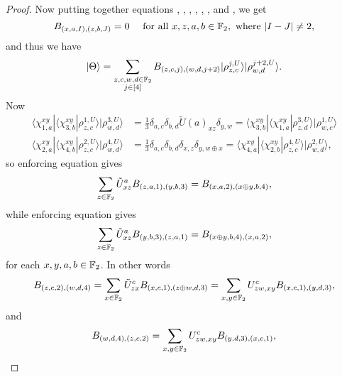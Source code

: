 \documentclass[../thesis-main/thesis-main]{subfiles}
\begin{document}
\begin{proof}
Now putting together equations , , , , , , and , we get
\begin{equation}
  B_{\left(x,a,I\right),\left(z,b,J\right)}=0\quad \text{ for all } x,z,a,b\in \mathbb{F}_2,\text{ where } |I- J| \neq 2,
\end{equation}
and thus we have
\begin{equation}
  |\Theta\rangle=\sum_{\substack{z,c,w,d\in \mathbb{F}_2\\j\in [4]} }B_{\left(z,c,j\right),\left(w,d,j+2\right)}|\rho_{z,c}^{j,U}\rangle|\rho_{w,d}^{j+2,U}\rangle.\label{eq:sum4terms}
\end{equation}
Now 
\begin{align}
  \langle\chi_{1,a}^{xy}|\langle\chi_{3,b}^{xy}|\rho_{z,c}^{1,U}\rangle|\rho_{w,d}^{3,U}\rangle & =\frac{1}{3}\delta_{a,c}\delta_{b,d} \tilde{U}(a)_{xz} \delta_{y,w} =  \langle\chi_{3,b}^{xy}|\langle\chi_{1,a}^{xy}|\rho_{z,d}^{3,U}\rangle|\rho_{w,c}^{1,U}\rangle\\
  \langle\chi_{2,a}^{xy}|\langle\chi_{4,b}^{xy}|\rho_{z,c}^{2,U}\rangle|\rho_{w,d}^{4,U}\rangle & =\frac{1}{3}\delta_{a,c}\delta_{b,d} \delta_{x,z} \delta_{y,w\oplus x} = \langle\chi_{4,a}^{xy}|\langle\chi_{2,b}^{xy}|\rho_{z,c}^{4,U}\rangle|\rho_{w,d}^{2,U}\rangle,
\end{align}
so enforcing equation  gives 
\begin{equation}
  \sum_{z\in\mathbb{F}_2}\tilde{U}^a_{xz}B_{\left(z,a,1\right),\left(y,b,3\right)}=B_{\left(x,a,2\right),\left(x\oplus y,b,4\right)},
\end{equation}
while enforcing equation  gives
\begin{equation}
  \sum_{z\in\mathbb{F}_2}\tilde{U}^a_{xz}B_{\left(y,b,3\right),\left(z,a,1\right)}=B_{\left(x\oplus y,b,4\right),\left(x,a,2\right)},
\end{equation}
for each $x,y,a,b\in\mathbb{F}_2$. In other words 
\begin{equation}
  B_{\left(z,c,2\right),\left(w,d,4\right)} =\sum_{x\in\mathbb{F}_2}\tilde{U}^c_{zx} B_{\left(x,c,1\right),\left(z\oplus w,d,3\right)} =\sum_{x,y\in\mathbb{F}_2}U^c_{zw,xy}B_{\left(x,c,1\right),\left(y,d,3\right)},
\end{equation}
and 
\begin{equation}
  B_{\left(w,d,4\right),\left(z,c,2\right)} =\sum_{x,y\in\mathbb{F}_2}U^c_{zw,xy}B_{\left(y,d,3\right),\left(x,c,1\right)},
\end{equation}

\end{proof}
\end{document}
